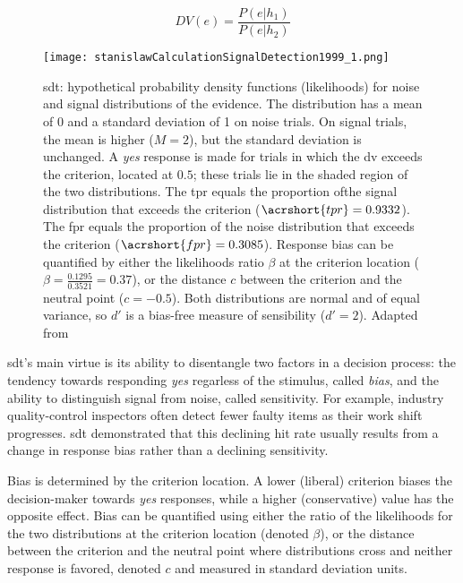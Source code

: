 $$DV(e) = \frac{P(e|h_1)}{P(e|h_2)}$$

\begin{figure}[ht]
    \centering
    \texttt{[image: stanislawCalculationSignalDetection1999\_1.png]}
    \caption[\acrlong{sdt}: graphical formalism]{\acrlong{sdt}: hypothetical probability density functions (likelihoods) for noise and signal distributions of the evidence. The distribution has a mean of 0 and a standard deviation of 1 on noise trials. On signal trials, the mean is higher ($M = 2$), but the standard deviation is unchanged. A \textit{yes} response is made for trials in which the \acrlong{dv} exceeds the criterion, located at $0.5$; these trials lie in the shaded region of the two distributions. The \acrlong{tpr} equals the proportion ofthe signal distribution that exceeds the criterion ($\acrshort{tpr} = 0.9332$). The \acrlong{fpr} equals the proportion of the noise distribution that exceeds the criterion ($\acrshort{fpr} = 0.3085$). Response bias can be quantified by either the likelihoods ratio $\beta$ at the criterion location ($\beta = \frac{0.1295}{0.3521} = 0.37$), or the distance $c$ between the criterion and the neutral point ($c = -0.5$). Both distributions are normal and of equal variance, so $d'$ is a bias-free measure of sensibility ($d'=2$). Adapted from \cite{myersPracticalIntroductionUsing2022}}
    \label{figure:sdt}
\end{figure}

\acrlong{sdt}'s main virtue is its ability to disentangle two factors in a decision process: the tendency towards responding \textit{yes} regarless of the stimulus, called \textit{bias}, and the ability to distinguish signal from noise, called \gls{sensitivity}. For example, industry quality-control inspectors often detect fewer faulty items as their work shift progresses. \Acrshort{sdt} demonstrated that this declining hit rate usually results from a change in response bias rather than a declining \gls{sensitivity}.

Bias is determined by the criterion location. A lower (liberal) criterion biases the decision-maker towards \textit{yes} responses, while a higher (conservative) value has the opposite effect. Bias can be quantified using either the ratio of the likelihoods for the two distributions at the criterion location (denoted $\beta$), or the distance between the criterion and the neutral point where distributions cross and neither response is favored, denoted $c$ and measured in standard deviation units.

